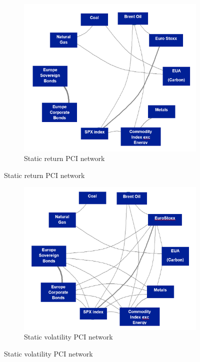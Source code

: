 \documentclass[preprint, 3p,
authoryear]{elsarticle} %
\begin{document}
\begin{figure}[!htb]
  \caption{Network representation of Pairwise Connectedness Index (PCI) (Jan 2013 – Jan 2025)}
  \label{fig:statPCI}
    \centering
      \begin{subfigure}[a]{\textwidth}
        \caption{Static return PCI network}
        \label{fig:statretPCI}
        \centering
        \includegraphics[width = 0.6\linewidth]{4aStatRetPCI}
      \end{subfigure}
\end{figure}
\begin{figure}[!htb]
\ContinuedFloat
      \begin{subfigure}[b]{\textwidth}
        \caption{Static volatility PCI network}
        \label{fig:statvolPCI}
        \centering
        \includegraphics[width = 0.6\linewidth]{4bStatVolPCI}
      \end{subfigure}
\end{figure}
\end{document}
